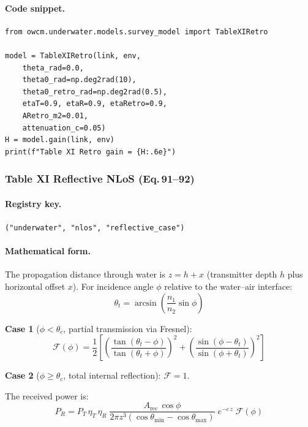 \documentclass[11pt,a4paper]{article}
\begin{document}
\paragraph{Code snippet.}
\begin{lstlisting}
from owcm.underwater.models.survey_model import TableXIRetro

model = TableXIRetro(link, env,
    theta_rad=0.0,
    theta0_rad=np.deg2rad(10),
    theta0_retro_rad=np.deg2rad(0.5),
    etaT=0.9, etaR=0.9, etaRetro=0.9,
    ARetro_m2=0.01,
    attenuation_c=0.05)
H = model.gain(link, env)
print(f"Table XI Retro gain = {H:.6e}")
\end{lstlisting}

\subsubsection{Table XI Reflective NLoS (Eq.\,91--92)}
\label{sec:uw_reflective}

\paragraph{Registry key.} \texttt{("underwater", "nlos", "reflective\_case")}

\paragraph{Mathematical form.}
The propagation distance through water is $z = h + x$ (transmitter depth $h$
plus horizontal offset $x$).  For incidence angle $\phi$ relative to the
water--air interface:
\begin{equation}
\theta_t = \arcsin\!\left(\frac{n_1}{n_2}\sin\phi\right)
\end{equation}

\textbf{Case 1} ($\phi < \theta_c$, partial transmission via Fresnel):
\begin{equation}
\mathcal{F}(\phi) = \frac{1}{2}\left[
  \left(\frac{\tan(\theta_t - \phi)}{\tan(\theta_t + \phi)}\right)^2
  + \left(\frac{\sin(\phi - \theta_t)}{\sin(\phi + \theta_t)}\right)^2
\right]
\end{equation}

\textbf{Case 2} ($\phi \ge \theta_c$, total internal reflection):
$\mathcal{F} = 1$.

The received power is:
\begin{equation}
\boxed{P_R = P_T\,\eta_T\,\eta_R\;
\frac{A_{\text{rec}}\,\cos\phi}
     {2\pi z^3 (\cos\theta_{\min} - \cos\theta_{\max})}
\; e^{-c\,z} \; \mathcal{F}(\phi)}
\end{equation}
\end{document}
